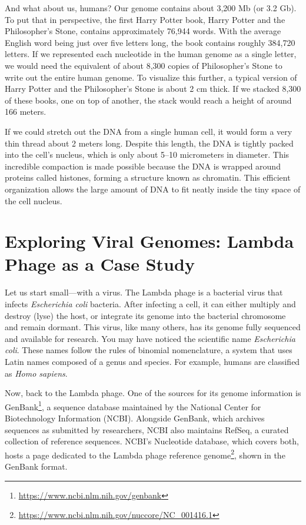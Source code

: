 And what about us, humans? Our genome contains about 3,200 Mb (or 3.2 Gb). To put that in perspective, the first Harry Potter book, Harry Potter and the Philosopher’s Stone, contains approximately 76,944 words. With the average English word being just over five letters long, the book contains roughly 384,720 letters. If we represented each nucleotide in the human genome as a single letter, we would need the equivalent of about 8,300 copies of Philosopher’s Stone to write out the entire human genome. To visualize this further, a typical version of Harry Potter and the Philosopher’s Stone is about 2 cm thick. If we stacked 8,300 of these books, one on top of another, the stack would reach a height of around 166 meters.

If we could stretch out the DNA from a single human cell, it would form a very thin thread about 2 meters long. Despite this length, the DNA is tightly packed into the cell's nucleus, which is only about 5–10 micrometers in diameter. This incredible compaction is made possible because the DNA is wrapped around proteins called histones, forming a structure known as chromatin. This efficient organization allows the large amount of DNA to fit neatly inside the tiny space of the cell nucleus.

\section{Exploring Viral Genomes: Lambda Phage as a Case Study}

Let us start small—with a virus. The Lambda phage is a bacterial virus that infects \textit{Escherichia coli} bacteria. After infecting a cell, it can either multiply and destroy (lyse) the host, or integrate its genome into the bacterial chromosome and remain dormant. This virus, like many others, has its genome fully sequenced and available for research. You may have noticed the scientific name \textit{Escherichia coli}. These names follow the rules of binomial nomenclature, a system that uses Latin names composed of a genus and species. For example, humans are classified as \textit{Homo sapiens}.

Now, back to the Lambda phage. One of the sources for its genome information is GenBank\footnote{\url{https://www.ncbi.nlm.nih.gov/genbank}},
a sequence database maintained by the National Center for Biotechnology Information (NCBI). Alongside GenBank, which archives sequences as submitted by researchers, NCBI also maintains RefSeq, a curated collection of reference sequences. NCBI's Nucleotide database, which covers both, hosts a page dedicated to the Lambda phage reference genome\footnote{\url{https://www.ncbi.nlm.nih.gov/nuccore/NC_001416.1}}, shown in the GenBank format.

